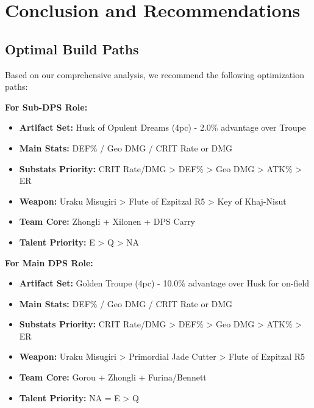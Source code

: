 \documentclass[12pt,a4paper]{article}
\begin{document}
\section{Conclusion and Recommendations}

\subsection{Optimal Build Paths}

Based on our comprehensive analysis, we recommend the following optimization paths:

\begin{tcolorbox}[colback=c0color!5, colframe=c0color, title=C0 Chiori Recommendations]
\textbf{For Sub-DPS Role:}
\begin{itemize}
    \item \textbf{Artifact Set:} Husk of Opulent Dreams (4pc) - 2.0\% advantage over Troupe
    \item \textbf{Main Stats:} DEF\% / Geo DMG / CRIT Rate or DMG
    \item \textbf{Substats Priority:} CRIT Rate/DMG > DEF\% > Geo DMG > ATK\% > ER
    \item \textbf{Weapon:} Uraku Misugiri > Flute of Ezpitzal R5 > Key of Khaj-Nisut
    \item \textbf{Team Core:} Zhongli + Xilonen + DPS Carry
    \item \textbf{Talent Priority:} E > Q > NA
\end{itemize}
\end{tcolorbox}

\begin{tcolorbox}[colback=c6color!5, colframe=c6color, title=C6 Chiori Recommendations]
\textbf{For Main DPS Role:}
\begin{itemize}
    \item \textbf{Artifact Set:} Golden Troupe (4pc) - 10.0\% advantage over Husk for on-field
    \item \textbf{Main Stats:} DEF\% / Geo DMG / CRIT Rate or DMG
    \item \textbf{Substats Priority:} CRIT Rate/DMG > DEF\% > Geo DMG > ATK\% > ER
    \item \textbf{Weapon:} Uraku Misugiri > Primordial Jade Cutter > Flute of Ezpitzal R5
    \item \textbf{Team Core:} Gorou + Zhongli + Furina/Bennett
    \item \textbf{Talent Priority:} NA = E > Q
\end{itemize}
\end{tcolorbox}
\end{document}
